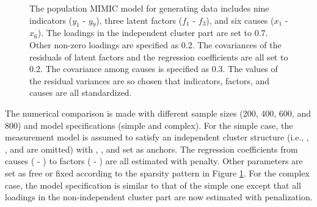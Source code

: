 \documentclass[nojss]{jss}
\begin{document}
\begin{figure}[t!]
\caption{\label{fig:true_model}The population MIMIC model for generating data includes nine indicators ($y_1$ - $y_9$), three latent factors ($f_1$ - $f_3$), and six causes ($x_1$ - $x_6$). The loadings in the independent cluster part are set to 0.7. Other non-zero loadings are specified as 0.2. The covariances of the residuals of latent factors and the regression coefficients are all set to 0.2. The covariance among causes is specified as 0.3. The values of the residual variances are so chosen that indicators, factors, and causes are all standardized.}
\end{figure}



The numerical comparison is made with different sample sizes (200, 400, 600, and 800) and model specifications (simple and complex). For the simple case, the measurement model is assumed to satisfy an independent cluster structure (i.e., , , and  are omitted) with , , and  set as anchors. The regression coefficients from causes ( - ) to factors ( - ) are all estimated with penalty. Other parameters are set as free or fixed according to the sparsity pattern in Figure \ref{fig:true_model}. For the complex case, the model specification is similar to that of the simple one except that all loadings in the non-independent cluster part are now estimated with penalization.
\end{document}
